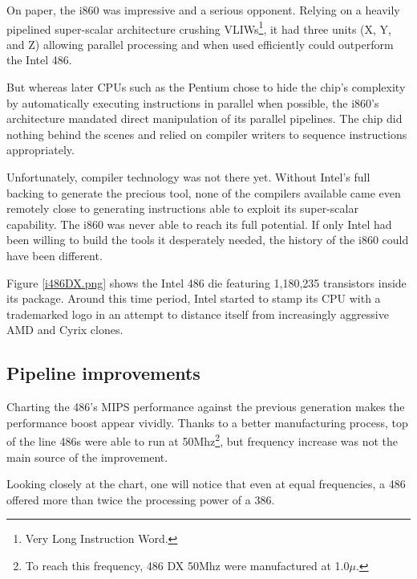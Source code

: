 On paper, the i860 was impressive and a serious opponent. Relying on a heavily pipelined super-scalar architecture crushing VLIWs\footnote{Very Long Instruction Word.}, it had three units (X, Y, and Z) allowing parallel processing and when used efficiently could outperform the Intel 486.\\
\par
But whereas later CPUs such as the Pentium chose to hide the chip's complexity by automatically executing instructions in parallel when possible, the i860's architecture mandated direct manipulation of its parallel pipelines. The chip did nothing behind the scenes and relied on compiler writers to sequence instructions appropriately.\\
\par
Unfortunately, compiler technology was not there yet. Without Intel's full backing to generate the precious tool, none of the compilers available came even remotely close to generating instructions able to exploit its super-scalar capability. The i860 was never able to reach its full potential. If only Intel had been willing to build the tools it desperately needed, the history of the i860 could have been different.\\
\par
\par
{}
\par
Figure \ref{i486DX.png} shows the Intel 486 die featuring 1,180,235 transistors inside its package. Around this time period, Intel started to stamp its CPU with a trademarked logo in an attempt to distance itself from increasingly aggressive AMD and Cyrix clones.\\
\par
{}

\par
\subsection{Pipeline improvements}
Charting the 486's MIPS performance against the previous generation makes the performance boost appear vividly. Thanks to a better manufacturing process, top of the line 486s were able to run at 50Mhz\footnote{To reach this frequency, 486 DX 50Mhz were manufactured at 1.0$\mu$.}, but frequency increase was not the main source of the improvement.\\
\par
 Looking closely at the chart, one will notice that even at equal frequencies, a 486 offered more than twice the processing power of a 386.\\

